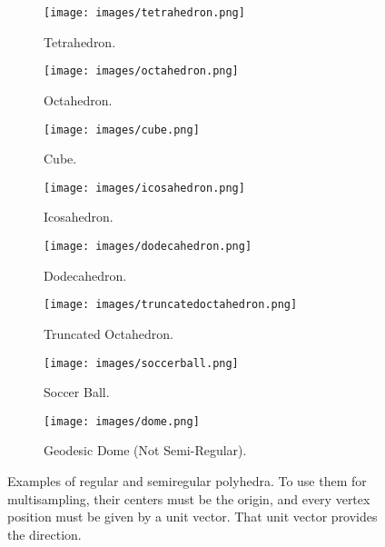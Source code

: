 \documentclass{article}
\begin{document}
\begin{figure}
        \begin{subfigure}[t]{0.23\textwidth}
        \texttt{[image: images/tetrahedron.png]}
        \caption{Tetrahedron. }
        \label{fig_tetrahedron.png}
    \end{subfigure}
    \hfill
            \begin{subfigure}[t]{0.23\textwidth}
        \texttt{[image: images/octahedron.png]}
        \caption{Octahedron. }
        \label{fig_octahedron.png}
    \end{subfigure}
    \hfill
    \begin{subfigure}[t]{0.23\textwidth}
        \texttt{[image: images/cube.png]}
        \caption{Cube. }
        \label{fig_cube.png}
    \end{subfigure}
    \hfill
        \begin{subfigure}[t]{0.23\textwidth}
        \texttt{[image: images/icosahedron.png]}
        \caption{Icosahedron. }
        \label{fig_icosahedron.png}
    \end{subfigure}
    \hfill
            \begin{subfigure}[t]{0.23\textwidth}
        \texttt{[image: images/dodecahedron.png]}
        \caption{Dodecahedron. }
        \label{fig_dodecahedron.png}
    \end{subfigure}
    \hfill
    \begin{subfigure}[t]{0.23\textwidth}
        \texttt{[image: images/truncatedoctahedron.png]}
        \caption{Truncated Octahedron. }
        \label{fig_truncatedoctahedron.png}
    \end{subfigure}
    \hfill
    \begin{subfigure}[t]{0.23\textwidth}
        \texttt{[image: images/soccerball.png]}
        \caption{Soccer Ball. }
        \label{fig_soccerball.png}
    \end{subfigure}
    \hfill
    \begin{subfigure}[t]{0.23\textwidth}
        \texttt{[image: images/dome.png]}
        \caption{Geodesic Dome (Not Semi-Regular). }
        \label{fig_dome.png}
    \end{subfigure}
    \hfill
        \caption{Examples of regular and semiregular polyhedra. To use them for multisampling, their centers must be the origin, and every vertex position must be given by a unit vector. That unit vector provides the direction. 
}
\end{figure}
\end{document}
